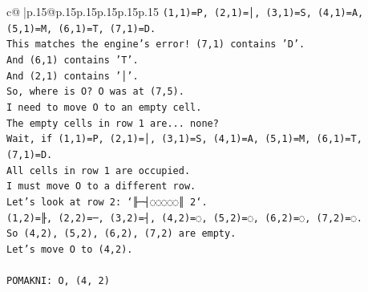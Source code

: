 \documentclass{article}
\begin{document}
{\begin{supertabular}{c@{$\;$}|p{.15\linewidth}@{}p{.15\linewidth}p{.15\linewidth}p{.15\linewidth}p{.15\linewidth}p{.15\linewidth}}
{{{\texttt{(1,1)=P, (2,1)=│, (3,1)=S, (4,1)=A, (5,1)=M, (6,1)=T, (7,1)=D.} \\
\texttt{This matches the engine's error! (7,1) contains 'D'.} \\
\texttt{And (6,1) contains 'T'.} \\
\texttt{And (2,1) contains '│'.} \\
\texttt{So, where is O? O was at (7,5).} \\
\texttt{I need to move O to an empty cell.} \\
\texttt{The empty cells in row 1 are... none?} \\
\texttt{Wait, if (1,1)=P, (2,1)=│, (3,1)=S, (4,1)=A, (5,1)=M, (6,1)=T, (7,1)=D.} \\
\texttt{All cells in row 1 are occupied.} \\
\texttt{I must move O to a different row.} \\
\texttt{Let's look at row 2: `╟─┤◌◌◌◌◌║ 2`.} \\
\texttt{(1,2)=╟, (2,2)=─, (3,2)=┤, (4,2)=◌, (5,2)=◌, (6,2)=◌, (7,2)=◌.} \\
\texttt{So (4,2), (5,2), (6,2), (7,2) are empty.} \\
\texttt{Let's move O to (4,2).} \\
\\ 
\texttt{POMAKNI: O, (4, 2)} \\
            }
        }
    }
     \\ \\


\end{supertabular}}
\end{document}
